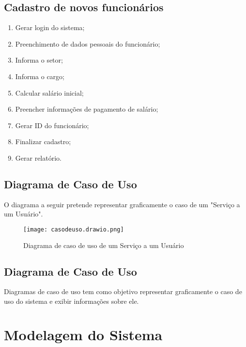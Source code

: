\subsection{ Cadastro de novos funcionários}
\begin{enumerate}
      \item Gerar login do sistema;
      \item Preenchimento de dados pessoais do funcionário;
      \item Informa o setor;
      \item Informa o cargo;
      \item Calcular salário inicial;
      \item Preencher informações de pagamento de salário;
      \item Gerar ID do funcionário;
      \item Finalizar cadastro;
      \item Gerar relatório.

\end{enumerate}

\subsection{ Diagrama de Caso de Uso}
O diagrama a seguir pretende representar graficamente o caso de um "Serviço a um Usuário".
\begin{figure}[H]
      \begin{center}
            \caption{ Diagrama de caso de uso de um Serviço a um Usuário} \label{afp}
            \texttt{[image: casodeuso.drawio.png]} \\


      \end{center}
\end{figure}




\subsection{ Diagrama de Caso de Uso}
Diagramas de caso de uso tem como objetivo representar graficamente o caso de uso do sistema e exibir informações sobre ele.






\section{Modelagem do Sistema}

